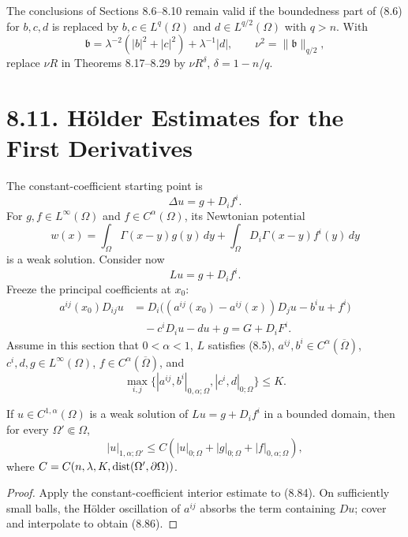 \begin{remark}
\label{gt-rem-8-integrable-lower-order-coefficients}
The conclusions of Sections 8.6--8.10 remain valid if the boundedness part of
(8.6) for $b,c,d$ is replaced by
$b,c\in L^q(\Omega)$ and $d\in L^{q/2}(\Omega)$ with $q>n$. With
\[
\mathfrak b=\lambda^{-2}(|b|^2+|c|^2)+\lambda^{-1}|d|,
\qquad \nu^2=\|\mathfrak b\|_{q/2},
\]
replace $\nu R$ in Theorems 8.17--8.29 by $\nu R^\delta$,
$\delta=1-n/q$.
\end{remark}

\section*{8.11. H\"older Estimates for the First Derivatives}

The constant-coefficient starting point is
\begin{equation}
\Delta u=g+D_if^i.
\tag{8.82}
\end{equation}
For $g,f\in L^\infty(\Omega)$ and $f\in C^\alpha(\Omega)$, its Newtonian
potential
\[
w(x)=\int_\Omega\Gamma(x-y)g(y)\,dy
+\int_\Omega D_i\Gamma(x-y)f^i(y)\,dy
\]
is a weak solution. Consider now
\begin{equation}
Lu=g+D_if^i.
\tag{8.83}
\end{equation}
Freeze the principal coefficients at $x_0$:
\begin{equation}
\begin{split}
a^{ij}(x_0)D_{ij}u
&=D_i\bigl((a^{ij}(x_0)-a^{ij}(x))D_ju-b^iu+f^i\bigr)\\
&\quad-c^iD_iu-du+g=G+D_iF^i.
\end{split}
\tag{8.84}
\end{equation}
Assume in this section that $0<\alpha<1$, $L$ satisfies (8.5),
$a^{ij},b^i\in C^\alpha(\overline\Omega)$,
$c^i,d,g\in L^\infty(\Omega)$, $f\in C^\alpha(\overline\Omega)$, and
\begin{equation}
\max_{i,j}\{|a^{ij},b^i|_{0,\alpha;\Omega},|c^i,d|_{0;\Omega}\}\leq K.
\tag{8.85}
\end{equation}

\begin{theorem}
\label{gt-thm-8-32-interior-gradient-holder}
If $u\in C^{1,\alpha}(\Omega)$ is a weak solution of
$Lu=g+D_if^i$ in a bounded domain, then for every $\Omega'\Subset\Omega$,
\begin{equation}
|u|_{1,\alpha;\Omega'}
\leq C(|u|_{0;\Omega}+|g|_{0;\Omega}+|f|_{0,\alpha;\Omega}),
\tag{8.86}
\end{equation}
where $C=C(n,\lambda,K,\operatorname{dist}(\Omega',\partial\Omega))$.
\end{theorem}
\begin{proof}
\sketch Apply the constant-coefficient interior estimate to (8.84). On sufficiently
small balls, the H\"older oscillation of $a^{ij}$ absorbs the term containing $Du$;
cover and interpolate to obtain (8.86).
\end{proof}

